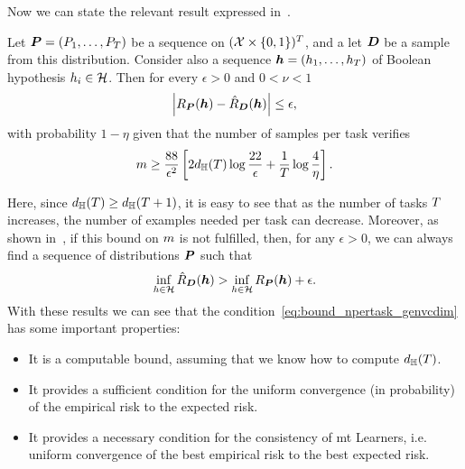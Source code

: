 


Now we can state the relevant result expressed in~\citet[Corollary~13]{baxter2000model}.
\begin{theorem}\label{th:baxter_vcdim}
    Let $\bm{P} = (P_1, \ldots, P_T)$ be a sequence on $(\mathcal{X} \times \left\{0, 1\right\})^T$, and a let $\bm{D}$ be a sample from this distribution. Consider also a sequence $\bm{h} = (h_1, \ldots, h_T)$ of Boolean hypothesis $h_i \in \mathcal{H}$. Then for every $\epsilon > 0$ and $0 < \nu < 1$
\begin{equation}
    \nonumber
    \left|R_{\bm{P}}(\bm{h}) - \hat{R}_{\bm{D}}(\bm{h})\right| \leq \epsilon,
\end{equation}
with probability $1 - \eta$ given that the number of samples per task verifies
\begin{equation}
    \label{eq:bound_npertask_genvcdim}
    \npertask \geq \frac{88}{\epsilon^2} \left[2 d_\hypspacef(\ntasks) \log \frac{22}{\epsilon} + \frac{1}{\ntasks}\log\frac{4}{\eta} \right] .
\end{equation}
\end{theorem}
Here, since $d_{\mathbb{H}}(T) \geq d_{\mathbb{H}}(T+1)$, it is easy to see that as the number of tasks $T$ increases, the number of examples needed per task can decrease. 
Moreover, as shown in~\citet[Theorem~14]{baxter2000model}, if this bound on $m$ is not fulfilled, then, for any $\epsilon > 0$, we can always find a sequence of distributions $\bm{P}$ such that
\begin{equation}
    \nonumber
    \inf_{h \in \mathcal{H}} \hat{R}_{\bm{D}}(\bm{h}) > \inf_{h \in \mathcal{H}} R_{\bm{P}}(\bm{h}) + \epsilon .
\end{equation}
With these results we can see that the condition~\eqref{eq:bound_npertask_genvcdim} has some important properties:
\begin{itemize}
    \item It is a computable bound, assuming that we know how to compute $d_{\mathbb{H}}(T)$.
    \item It provides a sufficient condition for the uniform convergence (in probability) of the empirical risk to the expected risk.
    \item It provides a necessary condition for the consistency of \acrshort{mt} Learners, i.e. uniform convergence of the best empirical risk to the best expected risk.
\end{itemize}

